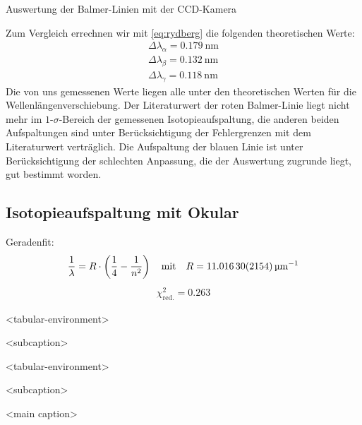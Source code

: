 \documentclass[11pt, a4paper]{article}
\numberwithin{equation}{section}
\begin{document}
\begin{table}[h]
\centering

\caption{Auswertung der Balmer-Linien mit der CCD-Kamera}
\label{tab:balmer_ccd_auswertung}
\end{table}
\noindent
Zum Vergleich errechnen wir mit \eqref{eq:rydberg} die folgenden theoretischen Werte:
\begin{align}
\Delta\lambda_\alpha=\SI{0.179}{\nano\metre}\\
\Delta\lambda_\beta=\SI{0.132}{\nano\metre}\\
\Delta\lambda_\gamma=\SI{0.118}{\nano\metre}
\end{align}
Die von uns gemessenen Werte liegen alle unter den theoretischen Werten für die Wellenlängenverschiebung.
Der Literaturwert der roten Balmer-Linie liegt nicht mehr im $1$-$\sigma$-Bereich der gemessenen Isotopieaufspaltung, die anderen beiden Aufspaltungen sind unter Berücksichtigung der Fehlergrenzen mit dem Literaturwert verträglich.
Die Aufspaltung der blauen Linie ist unter Berücksichtigung der schlechten Anpassung, die der Auswertung zugrunde liegt, gut bestimmt worden.
\clearpage

\subsection{Isotopieaufspaltung mit Okular}

Geradenfit:
\begin{align*}
	\frac{1}{\lambda} = R \cdot \left( \frac{1}{4} - \frac{1}{n^2} \right) \quad \text{mit} \quad R = \SI{11.0163 +- 0.02154}{\per\micro\metre}
\end{align*}
\begin{align*}
	\chi_\mathrm{red.}^2 = \num{0.263}
\end{align*}

\clearpage

\begin{table}
\centering
\begin{subtable}{0.5\textwidth}
\centering

<tabular-environment>

\caption{<subcaption>}
\end{subtable}%
\begin{subtable}{0.5\textwidth}
\centering

<tabular-environment>

\caption{<subcaption>}
\end{subtable}

\caption{<main caption>}
\end{table}
\end{document}
